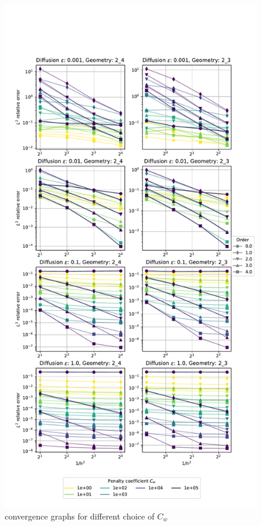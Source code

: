 \begin{figure}[p!]
	\centering
	\includegraphics[height=\textheight]{../figs/parametric/advdiff_2D/quarteroni3}
	
	\caption{ convergence graphs for different choice of $C_w$}
	\label{fig:conv_qart3}
\end{figure}